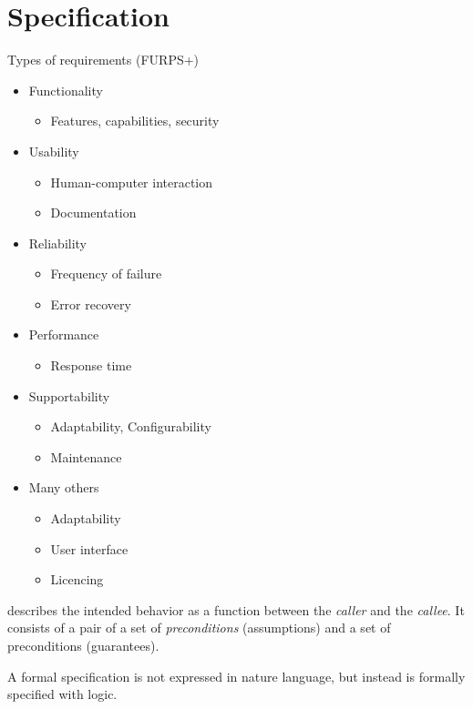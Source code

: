 \section{Specification}
Types of requirements (FURPS+)
\begin{itemize}
    \item Functionality
    \begin{itemize}
        \item Features, capabilities, security
    \end{itemize}
    \item Usability
    \begin{itemize}
        \item Human-computer interaction
        \item Documentation
    \end{itemize}
    \item Reliability
    \begin{itemize}
        \item Frequency of failure
        \item Error recovery
    \end{itemize}
    \item Performance
    \begin{itemize}
        \item Response time 
    \end{itemize}
    \item Supportability
    \begin{itemize}
        \item Adaptability, Configurability
        \item Maintenance
    \end{itemize}
    \item Many others
    \begin{itemize}
        \item Adaptability
        \item User interface
        \item Licencing
    \end{itemize}
\end{itemize}

 describes the intended behavior as a function between the \textit{caller} and the \textit{callee}.
It consists of a pair of a set of \textit{preconditions} (assumptions) and a set of preconditions (guarantees).

A formal specification is not expressed in nature language, but instead is formally specified with logic.

